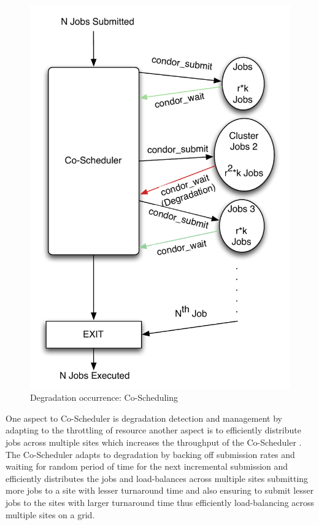 \documentclass[ms,electronic,double]{nuthesis}
\begin{document}
\begin{figure}[htbp!]
\begin{center}
\includegraphics[scale=0.75]{images/degradation_detection}
\caption{Degradation occurrence: Co-Scheduling}
\label{fig:degradationdetect-intro}
\end{center}
\end{figure}

One aspect to Co-Scheduler is degradation detection and management by adapting 
to the throttling of resource another aspect is to efficiently distribute jobs 
across multiple sites which increases the throughput of the Co-Scheduler
. The Co-Scheduler adapts to degradation by backing off submission rates and waiting for random
period of time for the next incremental submission and efficiently 
distributes the jobs and load-balances across multiple sites submitting more 
jobs to a site with lesser turnaround time and also ensuring to submit lesser 
jobs to the sites with larger turnaround time thus efficiently load-balancing 
across multiple sites on a grid.
\end{document}
